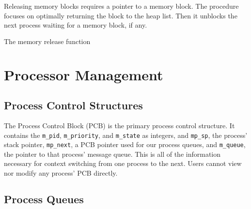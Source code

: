 \documentclass[12pt]{report}
\begin{document}
Releasing memory blocks requires a pointer to a memory block. The procedure focuses on optimally returning the block to the heap list. Then it unblocks the next process waiting for a memory block, if any.

\begin{algorithm}
  \caption{The memory release function}
  \begin{algorithmic}[1]
	  \EndIf
	  \EndIf
	  \EndIf
	  \EndIf
    \EndProcedure
  \end{algorithmic}
\end{algorithm}




\section{Processor Management}

\subsection{Process Control Structures}

The Process Control Block (PCB) is the primary process control structure. It
contains the \texttt{m_pid}, \texttt{m_priority}, and \texttt{m_state} as integers, and 
\texttt{mp_sp}, the process' stack pointer, \texttt{mp_next}, a PCB pointer used for our
process queues, and \texttt{m_queue}, the pointer to that process' message queue.
This is all of the information necessary for context switching from one process
to the next. Users cannot view nor modify any process' PCB directly.

\subsection{Process Queues}
\end{document}
